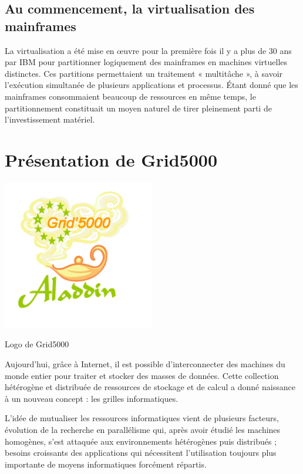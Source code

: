 \subsection{Au commencement, la virtualisation des mainframes}

La virtualisation a été mise en œuvre pour la première fois il y
a plus de 30 ans par IBM pour partitionner logiquement des mainframes
en machines virtuelles distinctes. Ces partitions permettaient un
traitement « multitâche », à savoir l'exécution simultanée de plusieurs applications et processus. Étant donné que les mainframes consommaient beaucoup de ressources en même temps, le partitionnement
constituait un moyen naturel de tirer pleinement parti de l'investissement matériel.

\section{Présentation de Grid5000}
\begin{center}
\includegraphics{images/logo.png}
\caption{Logo de Grid5000}
\end{center}

Aujourd’hui, grâce à Internet, il est possible
d’interconnecter des machines du monde entier pour
traiter et stocker des masses de données. Cette collection
hétérogène et distribuée de ressources de stockage et de
calcul a donné naissance à un nouveau concept : les
grilles informatiques.

L’idée de mutualiser les ressources
informatiques vient de plusieurs facteurs, évolution de la
recherche en parallélisme qui, après avoir étudié les
machines homogènes, s’est attaquée aux environnements
hétérogènes puis distribués ; besoins croissants des
applications qui nécessitent l’utilisation toujours plus
importante de moyens informatiques forcément répartis.

